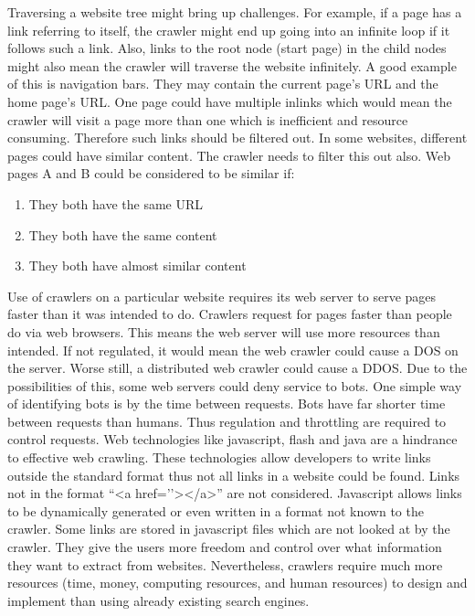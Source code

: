 \noindent
Traversing a website tree might bring up challenges. For example, if a page has a link referring to itself, the crawler might end up going into an infinite loop if it follows such a link. Also, links to the root node (start page) in the child nodes might also mean the crawler will traverse the website infinitely. A good example of this is navigation bars. They may contain the current page’s URL and the home page’s URL. One page could have multiple inlinks which would mean the crawler will visit a page more than one which is inefficient and resource consuming. Therefore such links should be filtered out. In some websites, different pages could have similar content. The crawler needs to filter this out also. Web pages A and B could be considered to be similar if:
\begin{enumerate}
\item They both have the same URL
\item They both have the same content
\item They both have almost similar content
\end{enumerate}

\noindent
Use of crawlers on a particular website requires its web server to serve pages faster than it was intended to do. Crawlers request for pages faster than people do via web browsers. This means the web server will use more resources than intended. If not regulated, it would mean the web crawler could cause a DOS on the server. Worse still, a distributed web crawler could cause a DDOS. Due to the possibilities of this, some web servers could deny service to bots. One simple way of identifying bots is by the time between requests. Bots have far shorter time between requests than humans. Thus regulation and throttling are required to control requests. Web technologies like javascript, flash and java are a hindrance to effective web crawling. These technologies allow developers to write links outside the standard format thus not all links in a website could be found. Links not in the format “<a href=’’></a>” are not considered. Javascript allows links to be dynamically generated or even written in a format not known to the crawler. Some links are stored in javascript files which are not looked at by the crawler. They give the users more freedom and control over what information they want to extract from websites. Nevertheless, crawlers require much more resources (time, money, computing resources, and human resources) to design and implement than using already existing search engines.

